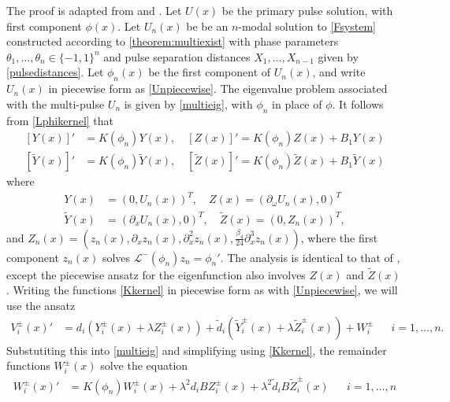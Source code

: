 \documentclass[12pt]{article}
\def\calL{{\mathcal L}}
\begin{document}
The proof is adapted from \cite{Manukian} and \cite{Sandstede1998}. Let $U(x)$ be the primary pulse solution, with first component $\phi(x)$. Let $U_n(x)$ be be an $n$-modal solution to \cref{Fsystem} constructed according to \cref{theorem:multiexist} with phase parameters $\theta_1, \dots, \theta_n \in \{ -1, 1 \}^n$ and pulse separation distances $X_1, \dots, X_{n-1}$ given by \cref{pulsedistances}. Let $\phi_n(x)$ be the first component of $U_n(x)$, and write $U_n(x)$ in piecewise form as \cref{Unpiecewise}. The eigenvalue problem associated with the multi-pulse $U_n$ is given by \cref{multieig}, with $\phi_n$ in place of $\phi$. It follows from \cref{Lphikernel} that
\begin{equation}\label{Kkernel}
\begin{aligned}
[Y(x)]' &= K(\phi_n)Y(x), \quad [Z(x)]' = K(\phi_n)Z(x) + B_1 Y(x) \\
[\tilde{Y}(x)]' &= K(\phi_n)\tilde{Y}(x), \quad [\tilde{Z}(x)]' = K(\phi_n)\tilde{Z}(x) + B_1 \tilde{Y}(x)
\end{aligned}
\end{equation}
where
\begin{equation}
\begin{aligned}
Y(x) &= ( 0, U_n(x) )^T, \quad
Z(x) = ( \partial_\omega U_n(x), 0 )^T \\
\tilde{Y}(x) &= ( \partial_x U_n(x), 0)^T, \quad
\tilde{Z}(x) = ( 0, Z_n(x) )^T,
\end{aligned}
\end{equation}
and $Z_n(x) = (z_n(x), \partial_x z_n(x), \partial_x^2 z_n(x), \frac{\beta_4}{24} \partial_x^3 z_n(x))$, where the first component $z_n(x)$ solves $\calL^-(\phi_n)z_n = \phi_n'$. The analysis is identical to that of \cite{Manukian}, except the piecewise ansatz for the eigenfunction also involves $Z(x)$ and $\tilde{Z}(x)$. Writing the functions \cref{Kkernel} in piecewise form as with \cref{Unpiecewise}, we will use the ansatz
\begin{align}\label{Vansatz}
V_i^\pm(x)' &= d_i(Y_i^\pm(x) + \lambda Z_i^\pm(x)) + \tilde{d}_i(\tilde{Y}_i^\pm(x) + \lambda \tilde{Z}_i^\pm(x)) + W_i^\pm && i = 1, \dots, n.
\end{align}
Substutiting this into \cref{multieig} and simplifying using \cref{Kkernel}, the remainder functions $W_i^\pm(x)$ solve the equation
\begin{align}\label{Wsolves}
W_i^\pm(x)' &= K(\phi_n)W_i^\pm(x) + \lambda^2 d_i B Z_i^\pm(x) + \lambda^2 \tilde{d}_i B \tilde{Z}_i^\pm(x) && i = 1, \dots, n
\end{align}
\end{document}
